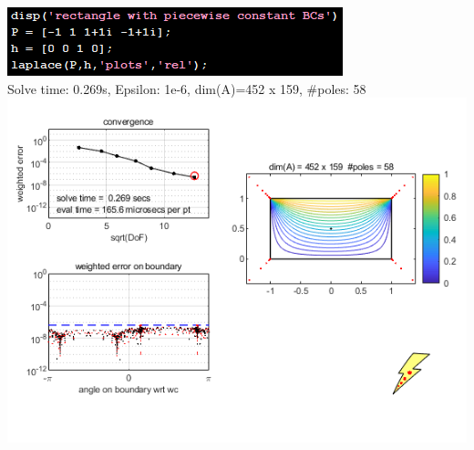 \documentclass{seminar}
\begin{document}
\begin{slide} %
\small
\begin{center}
\includegraphics[scale=0.65]{./PNG/rect_code}\\
Solve time: 0.269s, Epsilon: 1e-6, dim(A)=452 x 159, {\#}poles: 58\\
\includegraphics[scale=0.55]{./PNG/rect_pwbcs}
\end{center}
\end{slide} %
\end{document}
